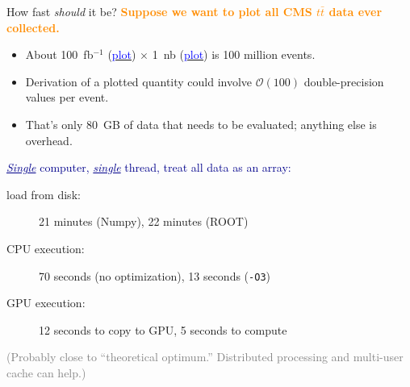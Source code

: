 \documentclass{beamer}
\begin{document}
\begin{frame}{How fast {\it should} it be?}
\vspace{0.3 cm}
\textcolor{darkorange}{\bf Suppose we want to plot all CMS $t\bar{t}$ data ever collected.}
\begin{itemize}
\item About 100~fb$^{-1}$ (\href{http://cms-service-lumi.web.cern.ch/cms-service-lumi/publicplots/int_lumi_cumulative_pp_1.png}{\textcolor{blue}{plot}}) $\times$ 1~nb (\href{https://atlas.web.cern.ch/Atlas/GROUPS/PHYSICS/CombinedSummaryPlots/SM/ATLAS_p_SMSummary_SqrtS_Zoom/ATLAS_p_SMSummary_SqrtS_Zoom.png}{\textcolor{blue}{plot}}) is 100 million events.
\item Derivation of a plotted quantity could involve $\mathcal{O}(100)$ double-precision values per event.
\item That's only 80~GB of data that needs to be evaluated; anything else is overhead.
\end{itemize}

\vspace{0.5 cm}
\textcolor{darkblue}{{\it \underline{Single}} computer, {\it \underline{single}} thread, treat all data as an array:}

\vspace{0.1 cm}
\begin{description}
\item[load from disk:] 21 minutes (Numpy), 22 minutes (ROOT)
\item[CPU execution:] 70 seconds (no optimization), 13 seconds ({\tt -O3})
\item[GPU execution:] 12 seconds to copy to GPU, 5 seconds to compute
\end{description}

\vspace{0.1 cm}
\textcolor{gray}{(Probably close to ``theoretical optimum.'' Distributed processing and multi-user cache can help.)}
\end{frame}
\end{document}
